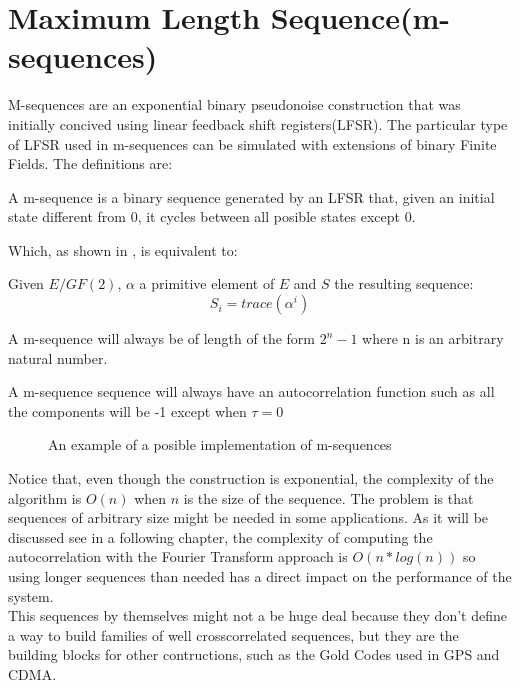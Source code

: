 \section{Maximum Length Sequence(m-sequences)}

M-sequences are an exponential binary pseudonoise construction that was
initially concived using linear feedback shift registers(LFSR). The particular
type of LFSR used in m-sequences can be simulated with extensions of binary
Finite Fields. The definitions are:

\begin{definition}[LFSR]
  A m-sequence is a binary sequence generated by an LFSR that, given an initial
  state different from 0, it cycles between all posible states except 0.
\end{definition}

Which, as shown in \citet{golomb_ref}, is equivalent to:

\begin{definition}
  Given $E/GF(2)$, $\alpha$ a primitive element of $E$ and $S$ the resulting
  sequence:
  \begin{equation}
    S_{i} = trace(\alpha^{i})
  \end{equation}
\end{definition}

\begin{property}
  A m-sequence will always be of length of the form $2^{n}-1$ where n is an
  arbitrary natural number.
\end{property}

\begin{property}
  A m-sequence sequence will always have an autocorrelation function such as
  all the components will be -1 except when $\tau = 0$
\end{property}

\begin{figure}[ht!]
  \caption{An example of a posible implementation of m-sequences}
  \label{mls:fig:1}
\end{figure}

Notice that, even though the construction is exponential, the complexity of
the algorithm is $O(n)$ when $n$ is the size of the sequence. The problem is
that sequences of arbitrary size might be needed in some applications. As it will
be discussed see in a following chapter, the complexity of computing the
autocorrelation with the Fourier Transform approach is $O(n*log(n))$ so using longer
sequences than needed has a direct impact on the performance of the system. \\

This sequences by themselves might not a be huge deal because they don't define
a way to build families of well crosscorrelated sequences, but they are the
building blocks for other contructions, such as the Gold Codes used in GPS and
CDMA.

